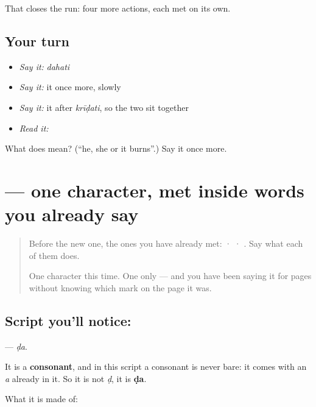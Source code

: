 \begin{grammarlens}[title={What you've built}]
That closes the run: four more actions, each met on its own.
\end{grammarlens}

\subsection*{Your turn}
\begin{itemize}
\raggedright
  \item \emph{Say it:} \emph{dahati}
  \item \emph{Say it:} it once more, slowly
  \item \emph{Say it:} it after \emph{krīḍati}, so the two sit together
  \item \emph{Read it:} \textbf{}
\end{itemize}

\begin{tcolorbox}[breakable,colback=teal!4,colframe=teal!35!black,title={Before you move on}]
What does  mean? (\textquotedblleft{}he, she or it burns\textquotedblright{}.) Say it once more.
\end{tcolorbox}
\section[\texorpdfstring{\sk{ड} (ḍa)}{ड (ḍa)}]{ — one character, met inside words you already say}

\label{lesson:SA-S221-letter-dda}



\begin{quote}
Before the new one, the ones you have already met:  ·  · . Say what each of them does.

One character this time. One only — and you have been saying it for pages without knowing which mark on the page it was.
\end{quote}

\subsection*{Script you'll notice: }
\textbf{} — \emph{ḍa}.

It is a \textbf{consonant}, and in this script a consonant is never bare: it comes with an \emph{a} already in it. So it is not \emph{ḍ}, it is \textbf{ḍa}.

What it is made of:

